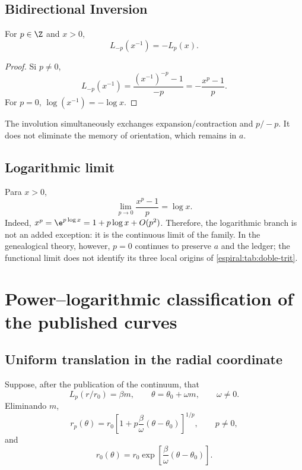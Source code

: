 \section{Bidirectional Inversion}

\begin{proposition}
For \(p\in\Z\) and \(x>0\),
\begin{equation}
 L_{-p}(x^{-1})=-L_p(x).
 \label{espiral:eq:lp-inversion}
\end{equation}
\end{proposition}
\begin{proof}
Si \(p\neq0\),
\[
 L_{-p}(x^{-1})
 =\frac{(x^{-1})^{-p}-1}{-p}
 =-\frac{x^p-1}{p}.
\]
For \(p=0\),
\(\log(x^{-1})=-\log x\).
\end{proof}

The involution simultaneously exchanges expansion/contraction and
\(p/-p\). It does not eliminate the memory of orientation, which remains in
\(a\).

\section{Logarithmic limit}

Para \(x>0\),
\[
 \lim_{p\to0}\frac{x^p-1}{p}=\log x.
\]
Indeed, \(x^p=\e^{p\log x}=1+p\log x+O(p^2)\). Therefore, the
logarithmic branch is not an added exception: it is the continuous limit of the family.
In the genealogical theory, however, \(p=0\) continues to preserve
\(a\) and the ledger; the functional limit does not identify its three
local origins of \cref{espiral:tab:doble-trit}.

\chapter{Power--logarithmic classification of the published curves}

\section{Uniform translation in the radial coordinate}

Suppose, after the publication of the continuum, that
\[
 L_p(r/r_0)=\beta m,
 \qquad
 \theta=\theta_0+\omega m,
 \qquad \omega\neq0.
\]
Eliminando \(m\),
\begin{equation}
 r_p(\theta)=r_0
 \left[1+p\frac{\beta}{\omega}
 (\theta-\theta_0)\right]^{1/p},
 \qquad p\neq0,
 \label{espiral:eq:familia-potencia}
\end{equation}
and
\begin{equation}
 r_0(\theta)=r_0
 \exp\!\left[\frac{\beta}{\omega}
 (\theta-\theta_0)\right].
 \label{espiral:eq:familia-log}
\end{equation}

